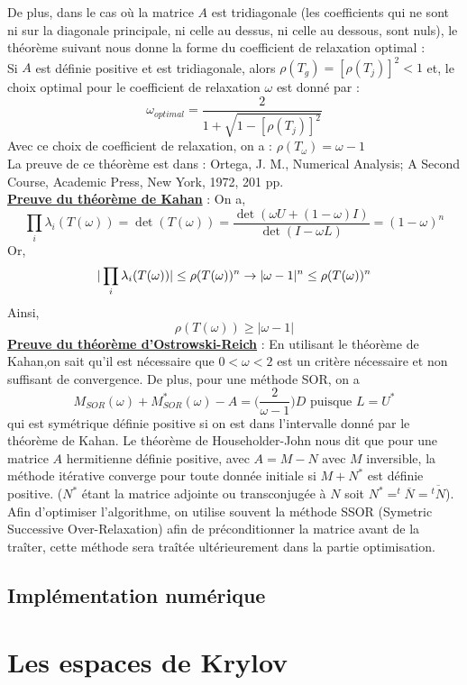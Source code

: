De plus, dans le cas où la matrice $A$ est tridiagonale (les coefficients qui ne sont ni sur la diagonale principale, ni celle au dessus, ni celle au dessous, sont nuls), le théorème suivant nous donne la forme du coefficient de relaxation optimal :\\

Si $A$ est définie positive et est tridiagonale, alors $\rho(T_g)=[\rho(T_j)]^2<1$ et, le choix optimal pour le coefficient de relaxation $\omega$ est donné par : 
$$
\omega_{optimal}=\frac{2}{1+\sqrt{1-[\rho(T_j)]^2}}
$$
Avec ce choix de coefficient de relaxation, on a : $\rho(T_\omega)=\omega-1$\\
La preuve de ce théorème est dans : Ortega, J. M., Numerical
Analysis; A Second Course, Academic Press, New York, 1972, 201 pp.\\
\underline{\textbf{Preuve du théorème de Kahan}} : On a,
$$
\prod\limits_i \lambda_i(T(\omega))=\det(T(\omega))=\frac{\det(\omega U+(1-\omega)I)}{\det(I-\omega L)}=(1-\omega)^n 
$$
Or,
$$
|\prod\limits_i \lambda_i(T(\omega))|\leq\rho(T(\omega))^n \\
\rightarrow |\omega-1|^n\leq\rho(T(\omega))^n\\
$$
Ainsi,
$$
\rho(T(\omega))\geq|\omega-1|
$$
\underline{\textbf{Preuve du théorème d'Ostrowski-Reich}} : En utilisant le théorème de Kahan,on sait qu'il est nécessaire que  $0<\omega<2$ est un critère nécessaire et non suffisant de convergence. De plus, pour une méthode SOR, on a 
$$
M_{SOR}(\omega)+M_{SOR}^*(\omega)-A=\bigg(\frac{2}{\omega-1}\bigg)D \text{ puisque }L=U^*
$$
qui est symétrique définie positive si on est dans l'intervalle donné par le théorème de Kahan. Le théorème de Householder-John nous dit que pour une matrice $A$ hermitienne définie positive, avec $A=M-N$ avec $M$ inversible, la méthode itérative converge pour toute donnée initiale si $M+N^*$ est définie positive. ($N^*$ étant la matrice adjointe ou transconjugée à $N$ soit $N^*=^t\overline{N}=\overline{^tN}$).\\

Afin d'optimiser l'algorithme, on utilise souvent la méthode SSOR (Symetric Successive Over-Relaxation) afin de préconditionner la matrice avant de la traîter, cette méthode sera traîtée ultérieurement dans la partie optimisation.
\subsection{Implémentation numérique}
\section{Les espaces de Krylov}

